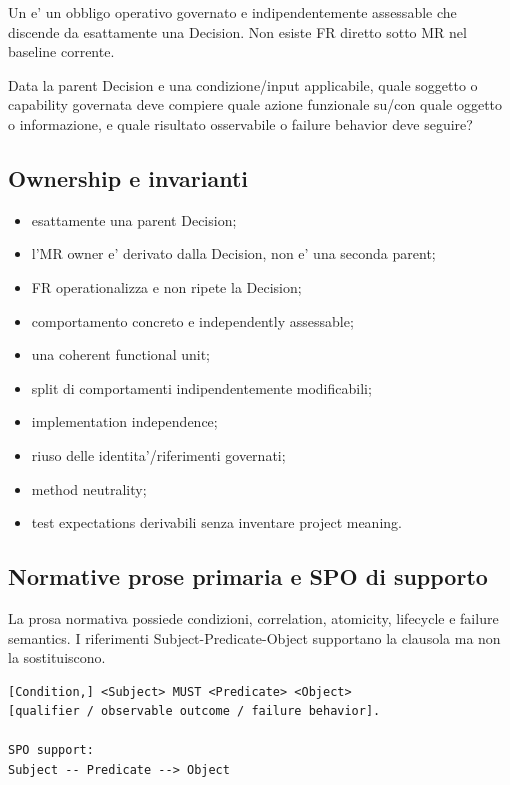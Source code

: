 \documentclass[11pt,a4paper]{article}
\begin{document}
Un \FR{} e' un obbligo operativo governato e indipendentemente assessable che discende da esattamente una Decision. Non esiste FR diretto sotto MR nel baseline corrente.

\begin{ddtacheck}[title={Domanda fondamentale}]
Data la parent Decision e una condizione/input applicabile, quale soggetto o capability governata deve compiere quale azione funzionale su/con quale oggetto o informazione, e quale risultato osservabile o failure behavior deve seguire?
\end{ddtacheck}

\subsection{Ownership e invarianti}
\begin{itemize}
  \item esattamente una parent Decision;
  \item l'MR owner e' derivato dalla Decision, non e' una seconda parent;
  \item FR operationalizza e non ripete la Decision;
  \item comportamento concreto e independently assessable;
  \item una coherent functional unit;
  \item split di comportamenti indipendentemente modificabili;
  \item implementation independence;
  \item riuso delle identita'/riferimenti governati;
  \item method neutrality;
  \item test expectations derivabili senza inventare project meaning.
\end{itemize}

\subsection{Normative prose primaria e SPO di supporto}
\closedtag

La prosa normativa possiede condizioni, correlation, atomicity, lifecycle e failure semantics. I riferimenti Subject-Predicate-Object supportano la clausola ma non la sostituiscono.

\begin{lstlisting}
[Condition,] <Subject> MUST <Predicate> <Object>
[qualifier / observable outcome / failure behavior].

SPO support:
Subject -- Predicate --> Object
\end{lstlisting}
\end{document}

